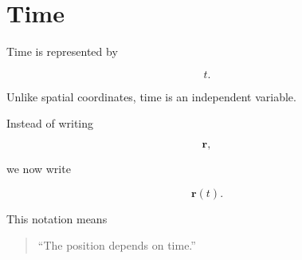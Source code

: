 \section{Time}

Time is represented by

\[
t.
\]

Unlike spatial coordinates, time is an independent variable.

Instead of writing

\[
\mathbf r,
\]

we now write

\[
\boxed{
	\mathbf r(t).
}
\]

This notation means

\begin{quote}
	``The position depends on time.''
\end{quote}

